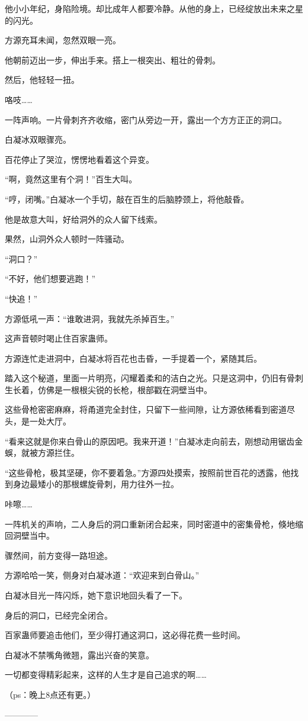 \begin{this_body}
他小小年纪，身陷险境。却比成年人都要冷静。从他的身上，已经绽放出未来之星的闪光。

方源充耳未闻，忽然双眼一亮。

他朝前迈出一步，伸出手来。搭上一根突出、粗壮的骨刺。

然后，他轻轻一扭。

咯吱……

一阵声响。一片骨刺齐齐收缩，密门从旁边一开，露出一个方方正正的洞口。

白凝冰双眼骤亮。

百花停止了哭泣，愣愣地看着这个异变。

“啊，竟然这里有个洞！”百生大叫。

“哼，闭嘴。”白凝冰一个手切，敲在百生的后脑脖颈上，将他敲昏。

他是故意大叫，好给洞外的众人留下线索。

果然，山洞外众人顿时一阵骚动。

“洞口？”

“不好，他们想要逃跑！”

“快追！”

方源低吼一声：“谁敢进洞，我就先杀掉百生。”

这声音顿时喝止住百家蛊师。

方源连忙走进洞中，白凝冰将百花也击昏，一手提着一个，紧随其后。

踏入这个秘道，里面一片明亮，闪耀着柔和的洁白之光。只是这洞中，仍旧有骨刺生长着，仿佛是一根根尖锐的长枪，根部戳在洞壁当中。

这些骨枪密密麻麻，将甬道完全封住，只留下一些间隙，让方源依稀看到密道尽头，是一处大厅。

“看来这就是你来白骨山的原因吧。我来开道！”白凝冰走向前去，刚想动用锯齿金蜈，就被方源拦住。

“这些骨枪，极其坚硬，你不要着急。”方源四处摸索，按照前世百花的透露，他找到身边最矮小的那根螺旋骨刺，用力往外一拉。

咔嚓……

一阵机关的声响，二人身后的洞口重新闭合起来，同时密道中的密集骨枪，倏地缩回洞壁当中。

骤然间，前方变得一路坦途。

方源哈哈一笑，侧身对白凝冰道：“欢迎来到白骨山。”

白凝冰目光一阵闪烁，她下意识地回头看了一下。

身后的洞口，已经完全闭合。

百家蛊师要追击他们，至少得打通这洞口，这必得花费一些时间。

白凝冰不禁嘴角微翘，露出兴奋的笑意。

一切都变得精彩起来，这样的人生才是自己追求的啊……

（ps：晚上8点还有更。）

------------

\end{this_body}

